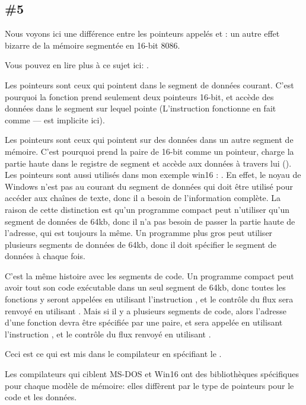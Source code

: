 \subsection{\Example{} \#5}
\label{win16_near_far_pointers}





Nous voyons ici une différence entre les pointeurs appelés  et : un
autre effet bizarre de la mémoire segmentée en 16-bit 8086.

Vous pouvez en lire plus à ce sujet ici: .

Les pointeurs  sont ceux qui pointent dans le segment de données courant.
C'est pourquoi la fonction  prend seulement deux pointeurs 16-bit,
et accède des données dans le segment sur lequel  pointe (L'instruction 
fonctionne en fait comme --- est implicite ici).

Les pointeurs  sont ceux qui pointent sur des données dans un autre segment
de mémoire.
C'est pourquoi  prend la paire de 16-bit comme un pointeur,
charge la partie haute dans le registre de segment  et accède aux données
à travers lui ().
Les pointeurs  sont aussi utilisés dans mon exemple win16
: .
En effet, le noyau de Windows n'est pas au courant du segment de données qui doit être
utilisé pour accéder aux chaînes de texte, donc il a besoin de l'information complète.
La raison de cette distinction est qu'un programme compact peut n'utiliser qu'un
segment de données de 64kb, donc il n'a pas besoin de passer la partie haute de l'adresse,
qui est toujours la même.
Un programme plus gros peut utiliser plusieurs segments de données de 64kb, donc il
doit spécifier le segment de données à chaque fois.

C'est la même histoire avec les segments de code.
Un programme compact peut avoir tout son code exécutable dans un seul segment de 64kb,
donc toutes les fonctions y seront appelées en utilisant l'instruction ,
et le contrôle du flux sera renvoyé en utilisant .
Mais si il y a plusieurs segments de code, alors l'adresse d'une fonction devra être
spécifiée par une paire, et sera appelée en utilisant l'instruction ,
et le contrôle du flux renvoyé en utilisant .

Ceci est ce qui est mis dans le compilateur en spécifiant le .

Les compilateurs qui ciblent MS-DOS et Win16 ont des bibliothèques spécifiques pour
chaque modèle de mémoire: elles diffèrent par le type de pointeurs pour le code et
les données.

